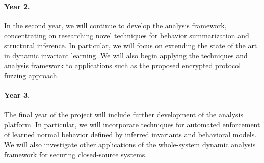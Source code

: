 \documentclass[letterpaper,twoside,11pt,headings=small]{scrartcl}
\newcommand{\basetitle}{TWC: Medium: Automated Reverse Engineering of Commodity Software}
\newcommand{\thetitle}{\basetitle\xspace}
\begin{document}
\paragraph{Year 2.} In the second year, we will continue to develop the
analysis framework, concentrating on researching novel techniques for behavior
summarization and structural inference.  In particular, we will focus on
extending the state of the art in dynamic invariant learning.  We will also
begin applying the techniques and analysis framework to applications such
as the proposed encrypted protocol fuzzing approach.

\paragraph{Year 3.} The final year of the project will include further
development of the analysis platform.  In particular, we will incorporate
techniques for automated enforcement of learned normal behavior defined by
inferred invariants and behavioral models.  We will also investigate other
applications of the whole-system dynamic analysis framework for securing
closed-source systems.


\newpage
{}
\setcounter{page}{1}
\setcounter{section}{0}



\newpage
{}
\setcounter{page}{1}
\setcounter{section}{0}




\end{document}
